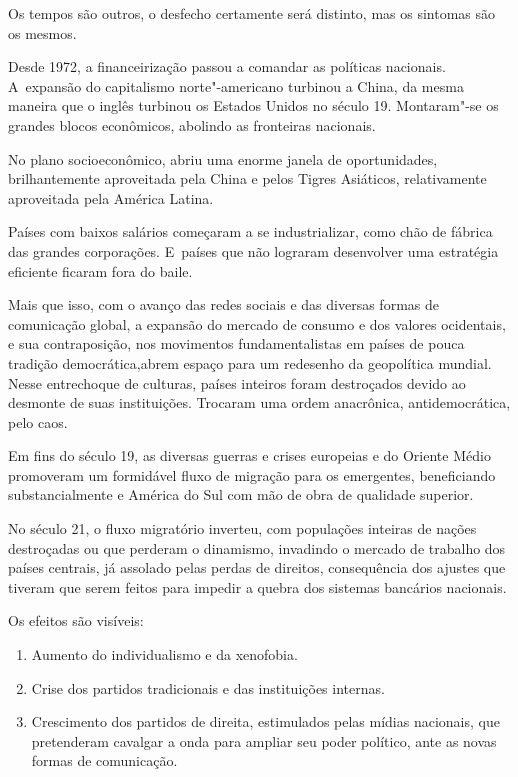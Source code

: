 Os tempos são outros, o desfecho certamente será distinto, mas os
sintomas são os mesmos.

Desde 1972, a financeirização passou a comandar as políticas nacionais.
A~expansão do capitalismo norte"-americano turbinou a China, da mesma
maneira que o inglês turbinou os Estados Unidos no século 19.
Montaram"-se os grandes blocos econômicos, abolindo as fronteiras
nacionais.

No plano socioeconômico, abriu uma enorme janela de oportunidades,
brilhantemente aproveitada pela China e pelos Tigres Asiáticos,
relativamente aproveitada pela América Latina.

Países com baixos salários começaram a se industrializar, como chão de
fábrica das grandes corporações. E~países que não lograram desenvolver
uma estratégia eficiente ficaram fora do baile.

Mais que isso, com o avanço das redes sociais e das diversas formas de
comunicação global, a expansão do mercado de consumo e dos valores
ocidentais, e sua contraposição, nos movimentos fundamentalistas em
países de pouca tradição democrática,abrem espaço para um redesenho da
geopolítica mundial. Nesse entrechoque de culturas, países inteiros
foram destroçados devido ao desmonte de suas instituições. Trocaram uma
ordem anacrônica, antidemocrática, pelo caos.

Em fins do século 19, as diversas guerras e crises europeias e do
Oriente Médio promoveram um formidável fluxo de migração para os
emergentes, beneficiando substancialmente  e América do Sul com mão
de obra de qualidade superior.

No século 21, o fluxo migratório inverteu, com populações inteiras de
nações destroçadas ou que perderam o dinamismo, invadindo o mercado de
trabalho dos países centrais, já assolado pelas perdas de direitos,
consequência dos ajustes que tiveram que serem feitos para impedir a
quebra dos sistemas bancários nacionais.

Os efeitos são visíveis:

\begin{enumerate}
\itemsep1pt\parskip0pt
\item
  Aumento do individualismo e da xenofobia.
\item
  Crise dos partidos tradicionais e das instituições internas.
\item
  Crescimento dos partidos de direita, estimulados pelas mídias
  nacionais, que pretenderam cavalgar a onda para ampliar seu poder
  político, ante as novas formas de comunicação.
\end{enumerate}

